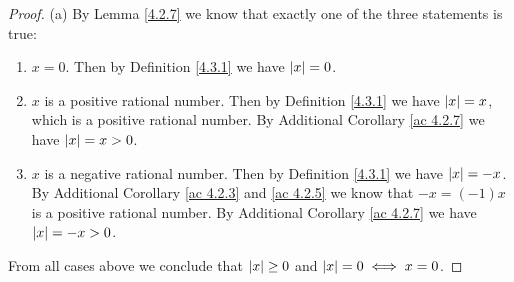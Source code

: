 \begin{proof}{(a)}
    By Lemma \ref{4.2.7} we know that exactly one of the three statements is true:
    \begin{enumerate}[label=(\Roman*)]
        \item \(x = 0\).
              Then by Definition \ref{4.3.1} we have \(\abs*{x} = 0\).
        \item \(x\) is a positive rational number.
              Then by Definition \ref{4.3.1} we have \(\abs*{x} = x\), which is a positive rational number.
              By Additional Corollary \ref{ac 4.2.7} we have \(\abs*{x} = x > 0\).
        \item \(x\) is a negative rational number.
              Then by Definition \ref{4.3.1} we have \(\abs*{x} = -x\).
              By Additional Corollary \ref{ac 4.2.3} and \ref{ac 4.2.5} we know that \(-x = (-1)x\) is a positive rational number.
              By Additional Corollary \ref{ac 4.2.7} we have \(\abs*{x} = -x > 0\).
    \end{enumerate}
    From all cases above we conclude that \(\abs*{x} \geq 0\) and \(\abs*{x} = 0 \iff x = 0\).
\end{proof}

